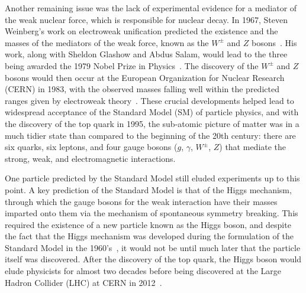Another remaining issue was the lack of experimental evidence for a mediator of the weak nuclear force, which is responsible for nuclear decay.
In 1967, Steven Weinberg's work on electroweak unification predicted the existence and the masses of the mediators of the weak force, known as the $W^\pm$ and $Z$ bosons~\cite{PhysRevLett.19.1264}.
His work, along with Sheldon Glashow and Abdus Salam, would lead to the three being awarded the 1979 Nobel Prize in Physics~\cite{NobelPrize:1979-Physics}.
The discovery of the $W^\pm$ and $Z$ bosons would then occur at the European Organization for Nuclear Research (CERN) in 1983, with the observed masses falling well within the predicted ranges given by electroweak theory~\cite{Arnison1983103,Arnison1983398}.
These crucial developments helped lead to widespread acceptance of the Standard Model (SM) of particle physics, and with the discovery of the top quark in 1995, the sub-atomic picture of matter was in a much tidier state than compared to the beginning of the 20th century: there are six quarks, six leptons, and four gauge bosons ($g$, $\gamma$, $W^\pm$, $Z$) that mediate the strong, weak, and electromagnetic interactions.

One particle predicted by the Standard Model still eluded experiments up to this point.
A key prediction of the Standard Model is that of the Higgs mechanism, through which the gauge bosons for the weak interaction have their masses imparted onto them via the mechanism of spontaneous symmetry breaking.
This required the existence of a new particle known as the Higgs boson, and despite the fact that the Higgs mechanism was developed during the formulation of the Standard Model in the 1960's~\cite{PhysRevLett.13.508}, it would not be until much later that the particle itself was discovered.
After the discovery of the top quark, the Higgs boson would elude physicists for almost two decades before being discovered at the Large Hadron Collider (LHC) at CERN in 2012~\cite{20121,201230}.

